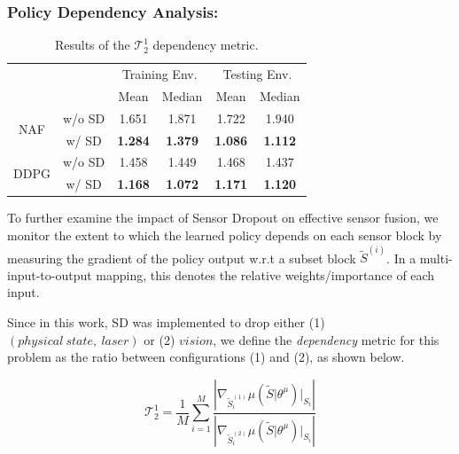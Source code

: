\documentclass[../thesis.tex]{subfiles}
\begin{document}
\subsubsection{Policy Dependency Analysis:}

\begin{table}[t]
\begin{center}
\caption{Results of the $\mathcal{T}_2^1$ dependency metric.}
\label{table:policy-ratio}
\begin{small}
\begin{sc}
\begin{tabular}{cccccc}
\toprule 
\centering
 & & \multicolumn{2}{c}{Training Env.} & \multicolumn{2}{c}{Testing Env.}  \\
 & & Mean & Median & Mean & Median \\ \midrule \midrule
\multirow{2}{*}{NAF}  & w/o SD & 1.651 & 1.871 & 1.722 & 1.940 \\
                      & w/ SD  & \textbf{1.284} & \textbf{1.379} & \textbf{1.086} & \textbf{1.112} \\ \midrule
\multirow{2}{*}{DDPG} & w/o SD & 1.458 & 1.449 & 1.468 & 1.437 \\
                      & w/ SD  & \textbf{1.168} & \textbf{1.072} & \textbf{1.171} & \textbf{1.120} \\ \toprule
\end{tabular}
\end{sc}
\end{small}
\end{center}
\end{table}


To further examine the impact of Sensor Dropout on effective sensor fusion, we monitor the extent to which the learned policy depends on each sensor block by measuring the gradient of the policy output w.r.t a subset block $\tilde{S}^{(i)}$. In a multi-input-to-output mapping, this denotes the relative weights/importance of each input. 

Since in this work, SD was implemented to drop either (1) $(physical~state,~ laser)$ or (2) $vision$, we define the \emph{dependency} metric for this problem as the ratio between configurations (1) and (2), as shown below.  

\begin{equation}
\mathcal{T}_2^1 = \frac{1}{M}\sum_{i=1}^M \frac{\left| \nabla_{\tilde{S}^{(1)}_i} \mu (\tilde{S} | \theta^\mu )\Big|_{S_i} \right|}{\left| \nabla_{\tilde{S}^{(2)}_i} \mu (\tilde{S} | \theta^\mu )\Big|_{S_i} \right|} 
\label{equ:grad_metric}
\end{equation}
\end{document}

